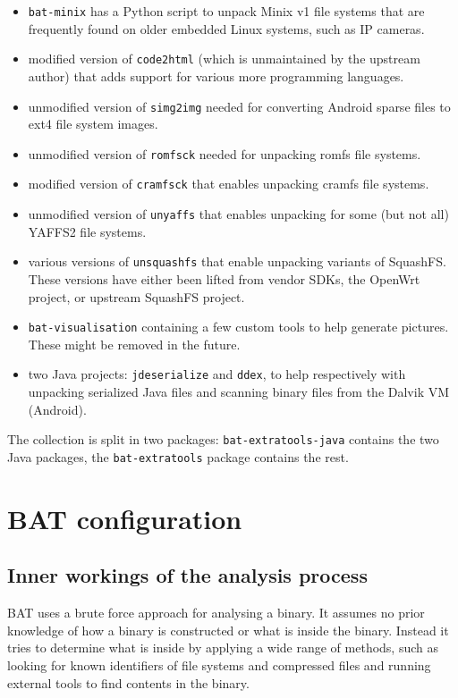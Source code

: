 \documentclass[10pt]{article}
\begin{document}
\begin{itemize}
\item \texttt{bat-minix} has a Python script to unpack Minix v1 file systems
that are frequently found on older embedded Linux systems, such as IP cameras.
\item modified version of \texttt{code2html} (which is unmaintained by the
upstream author) that adds support for various more programming languages.
\item unmodified version of \texttt{simg2img} needed for converting Android
sparse files to ext4 file system images.
\item unmodified version of \texttt{romfsck} needed for unpacking romfs file
systems.
\item modified version of \texttt{cramfsck} that enables unpacking cramfs
file systems.
\item unmodified version of \texttt{unyaffs} that enables unpacking for some
(but not all) YAFFS2 file systems.
\item various versions of \texttt{unsquashfs} that enable unpacking variants
of SquashFS. These versions have either been lifted from vendor SDKs, the
OpenWrt project, or upstream SquashFS project.
\item \texttt{bat-visualisation} containing a few custom tools to help generate
pictures. These might be removed in the future.
\item two Java projects: \texttt{jdeserialize} and \texttt{ddex}, to help
respectively with unpacking serialized Java files and scanning binary files
from the Dalvik VM (Android).
\end{itemize}

The collection is split in two packages: \texttt{bat-extratools-java} contains
the two Java packages, the \texttt{bat-extratools} package contains the rest.

\appendix

\section{BAT configuration}

\subsection{Inner workings of the analysis process}

BAT uses a brute force approach for analysing a binary. It assumes no prior
knowledge of how a binary is constructed or what is inside the binary. Instead
it tries to determine what is inside by applying a wide range of methods, such
as looking for known identifiers of file systems and compressed files and
running external tools to find contents in the binary.
\end{document}
